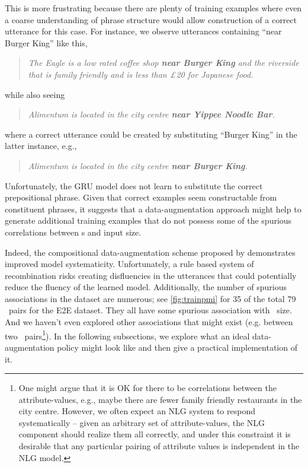 This is more frustrating because there are plenty of training examples where
even a coarse understanding of phrase structure would allow construction of a
correct utterance for this case.  For instance, we observe utterances
containing ``near Burger King'' like this,
\begin{quotation}
    \noindent \textit{The Eagle is a low rated coffee shop \textbf{near Burger King}
        and the riverside that is family friendly and is less than £20
    for Japanese food.}
\end{quotation}
while also seeing
\begin{quotation}
    \noindent \textit{Alimentum is located in the city centre \textbf{near Yippee Noodle Bar}. \textellipsis}
\end{quotation}
where a correct utterance could be created by substituting ``Burger King''
in the latter instance, e.g., 
\begin{quotation}
    \noindent \textit{Alimentum is located in the city centre \textbf{near Burger King}.}
\end{quotation}

Unfortunately, the GRU model does not learn to substitute the correct
prepositional phrase. Given that correct examples seem constructable from
constituent phrases, it suggests that a data-augmentation approach might help
to generate additional training examples that do not possess some of the
spurious correlations between \attributevalue s and input size.

Indeed, the compositional data-augmentation scheme proposed by
\citet{andreas2020} demonstrates  improved model systematicity.  Unfortunately,
a rule based system of recombination risks creating disfluencies in the
utterances that could potentially reduce the fluency of the learned model.
Additionally, the number of spurious associations in the dataset are numerous;
see \autoref{fig:trainpmi} for 35 of the total 79 \attributevalue~pairs for the
E2E dataset. They all have some spurious association with
\meaningrepresentation~size. And we haven't even explored other associations
that might exist (e.g. between two \attributevalue~pairs\footnote{One might
argue that it is OK for there to be correlations between the attribute-values,
e.g., maybe there are fewer family friendly restaurants in the city centre.
However, we often expect an NLG system to respond systematically -- given an
arbitrary set of attribute-values, the NLG component should realize them all
correctly, and under this constraint it is desirable that any particular
pairing of attribute values is independent in the NLG model.}).  In the
following subsections, we explore what an ideal data-augmentation policy might
look like and then give a practical implementation of it.

